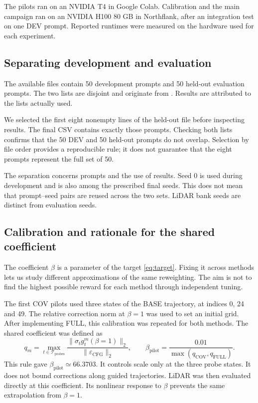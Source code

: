 \documentclass[11pt,a4paper]{article}
\newcommand{\code}[1]{\texttt{\detokenize{#1}}}
\begin{document}
The pilots ran on an NVIDIA T4 in Google Colab. Calibration and the main campaign ran on an NVIDIA H100 80 GB in Northflank, after an integration test on one DEV prompt. Reported runtimes were measured on the hardware used for each experiment.

\subsection{Separating development and evaluation}
The available files contain 50 development prompts and 50 held-out evaluation prompts. The two lists are disjoint and originate from \code{generation_prompts.txt}. Results are attributed to the lists actually used.

We selected the first eight nonempty lines of the held-out file before inspecting results. The final CSV contains exactly those prompts. Checking both lists confirms that the 50 DEV and 50 held-out prompts do not overlap. Selection by file order provides a reproducible rule; it does not guarantee that the eight prompts represent the full set of 50.

The separation concerns prompts and the use of results. Seed 0 is used during development and is also among the prescribed final seeds. This does not mean that prompt--seed pairs are reused across the two sets. LiDAR bank seeds are distinct from evaluation seeds.

\subsection{Calibration and rationale for the shared coefficient}
The coefficient $\beta$ is a parameter of the target \eqref{eq:target}. Fixing it across methods lets us study different approximations of the same reweighting. The aim is not to find the highest possible reward for each method through independent tuning.

The first COV pilots used three states of the BASE trajectory, at indices 0, 24 and 49. The relative correction norm at $\beta=1$ was used to set an initial grid. After implementing FULL, this calibration was repeated for both methods. The shared coefficient was defined as
\begin{equation}\label{eq:betapilot}
q_m=\max_{t\in\mathcal T_{\mathrm{probes}}}
\frac{\lVert\sigma_tg_t^{m}(\beta=1)\rVert_2}
{\lVert\varepsilon_{\mathrm{CFG}}\rVert_2},
\qquad \beta_{\mathrm{pilot}}=\frac{0.01}{\max(q_{\mathrm{COV}},q_{\mathrm{FULL}})}.
\end{equation}
This rule gave $\beta_{\mathrm{pilot}}\simeq66.3703$. It controls scale only at the three probe states. It does not bound corrections along guided trajectories. LiDAR was then evaluated directly at this coefficient. Its nonlinear response to $\beta$ prevents the same extrapolation from $\beta=1$.
\end{document}
